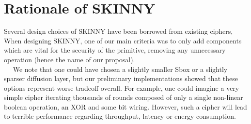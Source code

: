 \documentclass[preprint]{transcrypto}
\begin{document}
\section{Rationale of SKINNY}
\tab Several design choices of SKINNY have been borrowed from existing ciphers, When designing SKINNY, one of our main criteria was to only add components
which are vital for the security of the primitive, removing any unnecessary operation
(hence the name of our proposal).
\\
\tab$\quad$ We note that one could have chosen a slightly smaller Sbox or a slightly sparser diffusion layer, but our preliminary implementations showed that these options represent worse tradeoff overall. For example, one could imagine a very simple cipher iterating thousands of rounds composed of only a single non-linear boolean operation, an XOR and some bit wiring. However, such a cipher will lead to terrible performance regarding throughput, latency or energy consumption.
\end{document}
